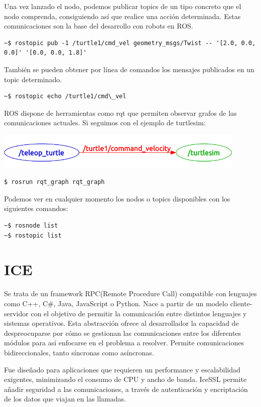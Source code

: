 \documentclass[12pt,spanish,chapterprefix, numbers=noenddot]{book}
\numberwithin{equation}{section}
\numberwithin{figure}{section}
\begin{document}
Una vez lanzado el nodo, podemos publicar topics de un tipo concreto que el nodo comprenda, consiguiendo así que realice una acción determinada. Estas comunicaciones son la base del desarrollo con robots en ROS. 
\begin{lstlisting}
~$ rostopic pub -1 /turtle1/cmd_vel geometry_msgs/Twist -- '[2.0, 0.0, 0.0]' '[0.0, 0.0, 1.8]'
\end{lstlisting}

También se pueden obtener por línea de comandos los mensajes publicados en un topic determinado.
\begin{lstlisting}
~$ rostopic echo /turtle1/cmd\_vel
\end{lstlisting}

ROS dispone de herramientas como rqt que permiten observar grafos de las comunicaciones actuales. Si seguimos con el ejemplo de turtlesim:
\begin{center}
\includegraphics[width=12cm]{Figs/teleopTurtle.png}
\end{center}
\begin{lstlisting}
$ rosrun rqt_graph rqt_graph
\end{lstlisting}
Podemos ver en cualquier momento los nodos o topics disponibles con los siguientes comandos: 
\begin{lstlisting}
~$ rosnode list 
~$ rostopic list
\end{lstlisting}

\section{ICE}
Se trata de un framework RPC(Remote Procedure Call) compatible con lenguajes como C++, C\#, Java, JavaScript o Python. Nace a partir de un modelo cliente-servidor con el objetivo de permitir la comunicación entre distintos lenguajes y sistemas operativos. Esta abstracción ofrece al desarrollador la capacidad de despreocuparse por cómo se gestionan las comunicaciones entre los diferentes módulos para así enfocarse en el problema a resolver. Permite comunicaciones bidireccionales, tanto síncronas como asíncronas. 

Fue diseñado para aplicaciones que requieren un performance y escalabilidad exigentes, minimizando el consumo de CPU y ancho de banda. IceSSL permite añadir seguridad a las comunicaciones, a través de autenticación y encriptación de los datos que viajan en las llamadas. 
\end{document}
